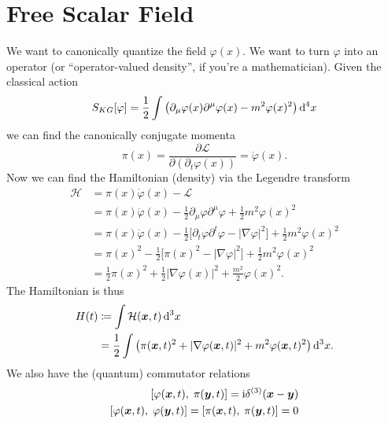 \section{Free Scalar Field} %

\M
We want to canonically quantize the field $\varphi(x)$. We want to turn
$\varphi$ into an operator (or ``operator-valued density'', if you're a
mathematician). Given the classical action
\begin{equation}
\action_{KG}[\varphi]=\frac{1}{2}\int\left(\partial_{\mu}\varphi(x)%
\partial^{\mu}\varphi(x)-m^{2}\varphi(x)^{2}\right)\D^{4}x
\end{equation}
we can find the canonically conjugate momenta
\begin{equation}
\pi(x)=\frac{\partial\mathcal{L}}{\partial(\partial_{t}\varphi(x))}=\dot{\varphi}(x).
\end{equation}
Now we can find the Hamiltonian (density) via the Legendre transform
\begin{subequations}
\begin{align}
\mathcal{H} 
&=\pi(x)\dot\varphi(x) - \mathcal{L}\\
&=\pi(x)\dot{\varphi}(x)
   -\frac{1}{2}\partial_{\mu}\varphi\partial^{\mu}\varphi
   +\frac{1}{2}m^{2}\varphi(x)^{2}\\
&=\pi(x)\dot{\varphi}(x)
  - \frac{1}{2}\bigl[\partial_{t}\varphi\partial^{t}\varphi-|\nabla\varphi|^{2}\bigr]
  + \frac{1}{2}m^{2}\varphi(x)^{2}\\
&=\pi(x)^{2}
  - \frac{1}{2}\bigl[\pi(x)^{2}-|\nabla\varphi|^{2}\bigr]
  + \frac{1}{2}m^{2}\varphi(x)^{2}\\
&=\frac{1}{2}\pi(x)^{2}
  +\frac{1}{2}|\nabla\varphi(x)|^{2}
  +\frac{m^{2}}{2}\varphi(x)^{2}.
\end{align}
\end{subequations}
The Hamiltonian is thus
\begin{equation}
\begin{split}
H(t) &\eqDef\int\mathcal{H}(\vec{x},t)\,\D^{3}x\\
&=\frac{1}{2}\int\left(\pi(\vec{x},t)^{2}+|\nabla\varphi(\vec{x},t)|^{2}+m^{2}\varphi(\vec{x},t)^{2}\right)\D^{3}x.
\end{split}
\end{equation}
We also have the (quantum) commutator relations
\begin{equation}
\begin{split}
\commutator{\varphi(\vec{x},t)}{\pi(\vec{y},t)}=\I\delta^{(3)}(\vec{x}-\vec{y})\\
\commutator{\varphi(\vec{x},t)}{\varphi(\vec{y},t)}=
\commutator{\pi(\vec{x},t)}{\pi(\vec{y},t)}=0
\end{split}
\end{equation}



